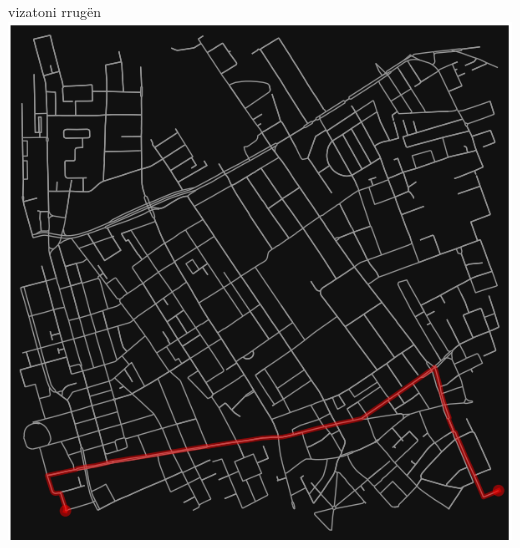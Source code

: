 \documentclass[
  ignorenonframetext,
]{beamer}
\begin{document}
\begin{frame}{vizatoni rrugën}
\protect\hypertarget{vizatoni-rruguxebn-1}{}
\includegraphics{./Figs/rrshk.png}
\end{frame}
\end{document}
